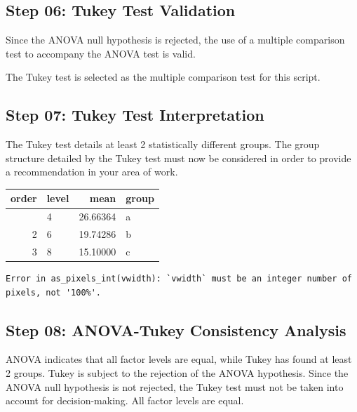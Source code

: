 \documentclass[
  letterpaper,
  DIV=11,
  numbers=noendperiod]{scrartcl}
\begin{document}
\subsection{\texorpdfstring{\textbf{Step 06:} Tukey Test
Validation}{Step 06: Tukey Test Validation}}\label{step-06-tukey-test-validation}

Since the ANOVA null hypothesis is rejected, the use of a multiple
comparison test to accompany the ANOVA test is valid.

The Tukey test is selected as the multiple comparison test for this
script.

\newpage

\subsection{\texorpdfstring{\textbf{Step 07:} Tukey Test
Interpretation}{Step 07: Tukey Test Interpretation}}\label{step-07-tukey-test-interpretation}

The Tukey test details at least 2 statistically different groups. The
group structure detailed by the Tukey test must now be considered in
order to provide a recommendation in your area of work.

\begin{longtable}[]{@{}rlrl@{}}
\toprule\noalign{}
order & level & mean & group \\
\midrule\noalign{}
\endhead
\bottomrule\noalign{}
\endlastfoot
1 & 4 & 26.66364 & a \\
2 & 6 & 19.74286 & b \\
3 & 8 & 15.10000 & c \\
\end{longtable}

\begin{verbatim}
Error in as_pixels_int(vwidth): `vwidth` must be an integer number of pixels, not '100%'.
\end{verbatim}

\newpage

\subsection{\texorpdfstring{\textbf{Step 08:} ANOVA-Tukey Consistency
Analysis}{Step 08: ANOVA-Tukey Consistency Analysis}}\label{step-08-anova-tukey-consistency-analysis}

ANOVA indicates that all factor levels are equal, while Tukey has found
at least 2 groups. Tukey is subject to the rejection of the ANOVA
hypothesis. Since the ANOVA null hypothesis is not rejected, the Tukey
test must not be taken into account for decision-making. All factor
levels are equal.
\end{document}
